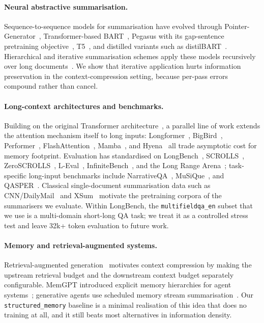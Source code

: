 \documentclass[11pt]{article}
\begin{document}
\paragraph{Neural abstractive summarisation.}
Sequence-to-sequence models for summarisation have evolved through
Pointer-Generator~\citep{see2017pointer}, Transformer-based BART~\citep{lewis2020bart},
Pegasus with its gap-sentence pretraining objective~\citep{zhang2020pegasus},
T5~\citep{raffel2020t5}, and distilled variants such as
distilBART~\citep{shleifer2020distilbart}. Hierarchical and iterative
summarisation schemes apply these models recursively over long
documents~\citep{wu2021recursively,liu2022brio}. We show that iterative
application hurts information preservation in the context-compression
setting, because per-pass errors compound rather than cancel.

\paragraph{Long-context architectures and benchmarks.}
Building on the original Transformer architecture~\citep{vaswani2017attention}, a parallel line of work extends the attention mechanism itself to long
inputs: Longformer~\citep{beltagy2020longformer},
BigBird~\citep{zaheer2020bigbird}, Performer~\citep{choromanski2020rethinking},
FlashAttention~\citep{dao2022flashattention},
Mamba~\citep{gu2023mamba}, and Hyena~\citep{poli2023hyena} all trade
asymptotic cost for memory footprint. Evaluation has standardised on
LongBench~\citep{bai2023longbench}, SCROLLS~\citep{shaham2022scrolls},
ZeroSCROLLS~\citep{shaham2023zeroscrolls},
L-Eval~\citep{an2023leval}, InfiniteBench~\citep{zhang2024infinitebench}, and
the Long Range Arena~\citep{tay2021longrangearena}; task-specific long-input
benchmarks include NarrativeQA~\citep{kocisky2018narrativeqa},
MuSiQue~\citep{trivedi2022musique}, and
QASPER~\citep{dasigi2021qasper}. Classical single-document summarisation
data such as CNN/DailyMail~\citep{hermann2015teaching} and
XSum~\citep{narayan2018xsum} motivate the pretraining corpora of the
summarisers we evaluate.
Within LongBench, the \texttt{multifieldqa\_en} subset that we use is a
multi-domain short-long QA task; we treat it as a controlled stress test
and leave 32k+ token evaluation to future work.

\paragraph{Memory and retrieval-augmented systems.}
Retrieval-augmented generation~\citep{lewis2020rag,guu2020realm,karpukhin2020dpr,izacard2022atlas,wang2023augmenting}
motivates context compression by making the upstream retrieval budget
and the downstream context budget separately configurable. MemGPT
introduced explicit memory hierarchies for agent
systems~\citep{packer2024memgpt}; generative agents use scheduled
memory stream summarisation~\citep{park2023generative}. Our
\texttt{structured\_memory} baseline is a minimal realisation of this
idea that does no training at all, and it still beats most
alternatives in information density.
\end{document}
